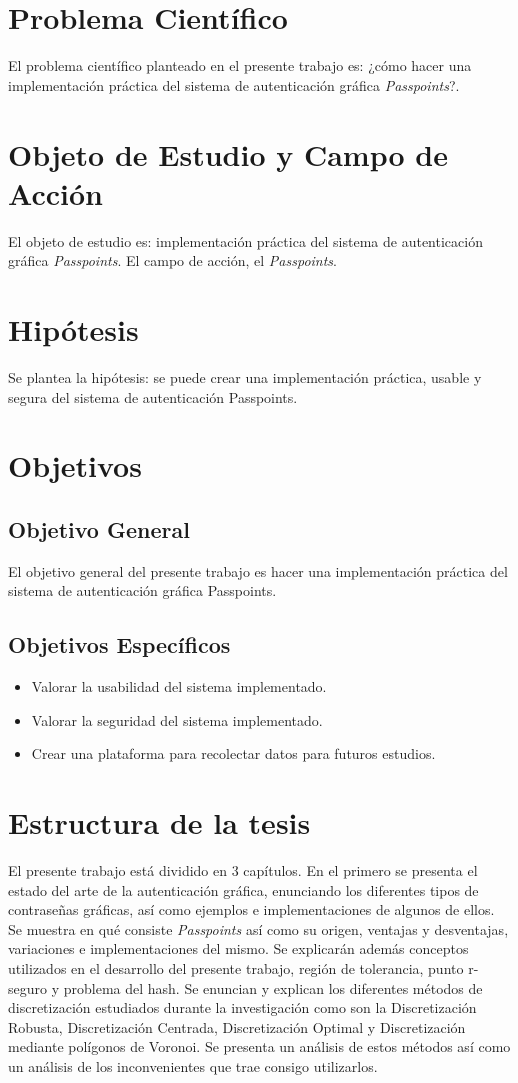 \section*{Problema Científico}
El problema científico planteado en el presente trabajo es: ¿cómo hacer una implementación práctica del sistema de autenticación gráfica \textit{Passpoints}?.
\section*{Objeto de Estudio y Campo de Acción}
El objeto de estudio es: implementación práctica del sistema de autenticación gráfica  \textit{Passpoints}. 
El campo de acción, el \textit{Passpoints}.
\section*{Hipótesis}
Se plantea la hipótesis: se puede crear una implementación práctica, usable y segura
del sistema de autenticación Passpoints.

\section*{Objetivos}
\subsection*{Objetivo General}
El objetivo general del presente trabajo es
hacer una implementación práctica del sistema de autenticación gráfica Passpoints.

\subsection*{Objetivos Específicos}
\begin{itemize}
	\item  Valorar la usabilidad del sistema implementado.
	\item Valorar la seguridad del sistema implementado.
	\item  Crear una plataforma para recolectar datos para futuros estudios.
\end{itemize}


\section*{Estructura de la tesis}
El presente trabajo está dividido en 3 capítulos.
En el primero se presenta el estado del arte de la autenticación gráfica, enunciando los diferentes tipos de contraseñas gráficas, así como ejemplos e implementaciones de algunos de ellos. Se muestra en qué consiste \textit{Passpoints} así como su origen, ventajas y desventajas, variaciones e implementaciones del mismo. Se explicarán además conceptos utilizados en el desarrollo del presente trabajo, región de tolerancia, punto r-seguro y problema del hash. Se enuncian y explican los diferentes métodos de discretización estudiados durante la investigación como son la Discretización Robusta, Discretización Centrada, Discretización Optimal y Discretización mediante polígonos de Voronoi. Se presenta un análisis de estos métodos así como un análisis de los inconvenientes que trae consigo utilizarlos.


